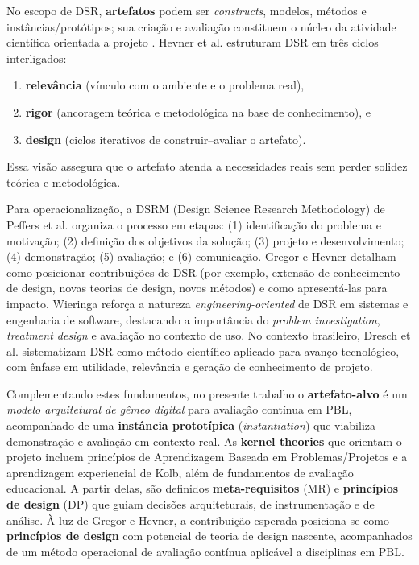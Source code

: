 \documentclass[12pt,a4paper]{article}
\begin{document}
No escopo de DSR, \textbf{artefatos} podem ser \textit{constructs}, modelos,
métodos e instâncias/protótipos; sua criação e avaliação constituem o núcleo da
atividade científica orientada a projeto \cite{march1995design}. Hevner et
al. \cite{hevner2004design} estruturam DSR em três ciclos interligados:
\begin{enumerate}
  \item \textbf{relevância} (vínculo com o ambiente e o problema real),
  \item \textbf{rigor} (ancoragem teórica e metodológica na base de conhecimento), e
  \item \textbf{design} (ciclos iterativos de construir–avaliar o artefato).
\end{enumerate}
Essa
visão assegura que o artefato atenda a necessidades reais sem perder solidez
teórica e metodológica.

Para operacionalização, a DSRM (Design Science Research Methodology) de Peffers
et al. \cite{peffers2007design} organiza o processo em etapas: (1)
identificação do problema e motivação; (2) definição dos objetivos da solução; (3)
projeto e desenvolvimento; (4) demonstração; (5) avaliação; e (6)
comunicação. Gregor e Hevner \cite{gregor2013positioning} detalham como
posicionar contribuições de DSR (por exemplo, extensão de conhecimento de
design, novas teorias de design, novos métodos) e como apresentá-las para
impacto. Wieringa \cite{wieringa2014design} reforça a natureza
\textit{engineering-oriented} de DSR em sistemas e engenharia de software,
destacando a importância do \textit{problem investigation}, \textit{treatment
design} e avaliação no contexto de uso. No contexto brasileiro, Dresch et
al. \cite{dresch2015design} sistematizam DSR como método científico aplicado
para avanço tecnológico, com ênfase em utilidade, relevância e geração de
conhecimento de projeto.

Complementando estes fundamentos, no presente trabalho o \textbf{artefato-alvo}
é um \textit{modelo arquitetural de gêmeo digital} para avaliação contínua em
PBL, acompanhado de uma \textbf{instância prototípica} (\textit{instantiation})
que viabiliza demonstração e avaliação em contexto real. As \textbf{kernel
theories} que orientam o projeto incluem princípios de Aprendizagem Baseada em
Problemas/Projetos e a aprendizagem experiencial de Kolb, além de fundamentos
de avaliação educacional. A partir delas, são definidos \textbf{meta-requisitos}
(MR) e \textbf{princípios de design} (DP) que guiam decisões arquiteturais,
de instrumentação e de análise. À luz de Gregor e Hevner, a contribuição
esperada posiciona-se como \textbf{princípios de design} com potencial de
teoria de design nascente, acompanhados de um método operacional de avaliação
contínua aplicável a disciplinas em PBL.
\end{document}
